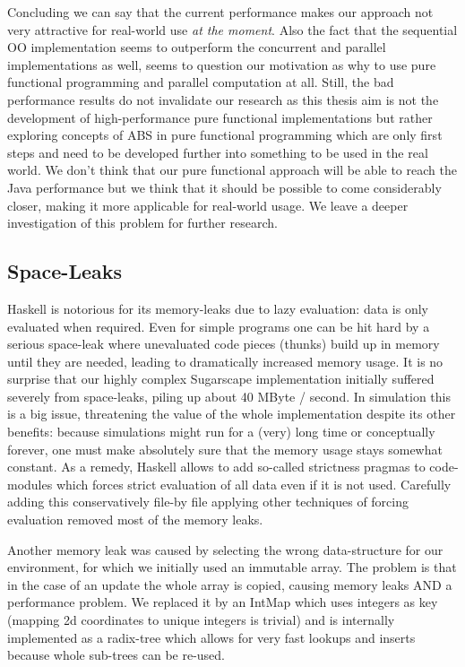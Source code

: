 Concluding we can say that the current performance makes our approach not very attractive for real-world use \textit{at the moment}. Also the fact that the sequential OO implementation seems to outperform the concurrent and parallel implementations as well, seems to question our motivation as why to use pure functional programming and parallel computation at all. Still, the bad performance results do not invalidate our research as this thesis aim is not the development of high-performance pure functional implementations but rather exploring concepts of ABS in pure functional programming which are only first steps and need to be developed further into something to be used in the real world. We don't think that our pure functional approach will be able to reach the Java performance but we think that it should be possible to come considerably closer, making it more applicable for real-world usage. We leave a deeper investigation of this problem for further research.

\subsection{Space-Leaks}
Haskell is notorious for its memory-leaks due to lazy evaluation: data is only evaluated when required. Even for simple programs one can be hit hard by a serious space-leak where unevaluated code pieces (thunks) build up in memory until they are needed, leading to dramatically increased memory usage. It is no surprise that our highly complex Sugarscape implementation initially suffered severely from space-leaks, piling up about 40 MByte / second. In simulation this is a big issue, threatening the value of the whole implementation despite its other benefits: because simulations might run for a (very) long time or conceptually forever, one must make absolutely sure that the memory usage stays somewhat constant. As a remedy, Haskell allows to add so-called strictness pragmas to code-modules which forces strict evaluation of all data even if it is not used. Carefully adding this conservatively file-by file applying other techniques of forcing evaluation removed most of the memory leaks.

Another memory leak was caused by selecting the wrong data-structure for our environment, for which we initially used an immutable array. The problem is that in the case of an update the whole array is copied, causing memory leaks AND a performance problem. We replaced it by an IntMap which uses integers as key (mapping 2d coordinates to unique integers is trivial) and is internally implemented as a radix-tree which allows for very fast lookups and inserts because whole sub-trees can be re-used.

